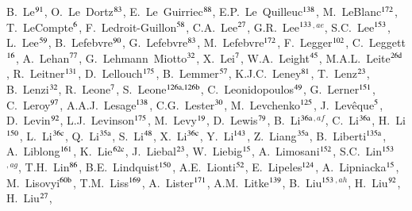 \begin{flushleft}
B.~Le$^\textrm{\scriptsize 91}$,
O.~Le~Dortz$^\textrm{\scriptsize 83}$,
E.~Le~Guirriec$^\textrm{\scriptsize 88}$,
E.P.~Le~Quilleuc$^\textrm{\scriptsize 138}$,
M.~LeBlanc$^\textrm{\scriptsize 172}$,
T.~LeCompte$^\textrm{\scriptsize 6}$,
F.~Ledroit-Guillon$^\textrm{\scriptsize 58}$,
C.A.~Lee$^\textrm{\scriptsize 27}$,
G.R.~Lee$^\textrm{\scriptsize 133}$$^{,ae}$,
S.C.~Lee$^\textrm{\scriptsize 153}$,
L.~Lee$^\textrm{\scriptsize 59}$,
B.~Lefebvre$^\textrm{\scriptsize 90}$,
G.~Lefebvre$^\textrm{\scriptsize 83}$,
M.~Lefebvre$^\textrm{\scriptsize 172}$,
F.~Legger$^\textrm{\scriptsize 102}$,
C.~Leggett$^\textrm{\scriptsize 16}$,
A.~Lehan$^\textrm{\scriptsize 77}$,
G.~Lehmann~Miotto$^\textrm{\scriptsize 32}$,
X.~Lei$^\textrm{\scriptsize 7}$,
W.A.~Leight$^\textrm{\scriptsize 45}$,
M.A.L.~Leite$^\textrm{\scriptsize 26d}$,
R.~Leitner$^\textrm{\scriptsize 131}$,
D.~Lellouch$^\textrm{\scriptsize 175}$,
B.~Lemmer$^\textrm{\scriptsize 57}$,
K.J.C.~Leney$^\textrm{\scriptsize 81}$,
T.~Lenz$^\textrm{\scriptsize 23}$,
B.~Lenzi$^\textrm{\scriptsize 32}$,
R.~Leone$^\textrm{\scriptsize 7}$,
S.~Leone$^\textrm{\scriptsize 126a,126b}$,
C.~Leonidopoulos$^\textrm{\scriptsize 49}$,
G.~Lerner$^\textrm{\scriptsize 151}$,
C.~Leroy$^\textrm{\scriptsize 97}$,
A.A.J.~Lesage$^\textrm{\scriptsize 138}$,
C.G.~Lester$^\textrm{\scriptsize 30}$,
M.~Levchenko$^\textrm{\scriptsize 125}$,
J.~Lev\^eque$^\textrm{\scriptsize 5}$,
D.~Levin$^\textrm{\scriptsize 92}$,
L.J.~Levinson$^\textrm{\scriptsize 175}$,
M.~Levy$^\textrm{\scriptsize 19}$,
D.~Lewis$^\textrm{\scriptsize 79}$,
B.~Li$^\textrm{\scriptsize 36a}$$^{,af}$,
C.~Li$^\textrm{\scriptsize 36a}$,
H.~Li$^\textrm{\scriptsize 150}$,
L.~Li$^\textrm{\scriptsize 36c}$,
Q.~Li$^\textrm{\scriptsize 35a}$,
S.~Li$^\textrm{\scriptsize 48}$,
X.~Li$^\textrm{\scriptsize 36c}$,
Y.~Li$^\textrm{\scriptsize 143}$,
Z.~Liang$^\textrm{\scriptsize 35a}$,
B.~Liberti$^\textrm{\scriptsize 135a}$,
A.~Liblong$^\textrm{\scriptsize 161}$,
K.~Lie$^\textrm{\scriptsize 62c}$,
J.~Liebal$^\textrm{\scriptsize 23}$,
W.~Liebig$^\textrm{\scriptsize 15}$,
A.~Limosani$^\textrm{\scriptsize 152}$,
S.C.~Lin$^\textrm{\scriptsize 153}$$^{,ag}$,
T.H.~Lin$^\textrm{\scriptsize 86}$,
B.E.~Lindquist$^\textrm{\scriptsize 150}$,
A.E.~Lionti$^\textrm{\scriptsize 52}$,
E.~Lipeles$^\textrm{\scriptsize 124}$,
A.~Lipniacka$^\textrm{\scriptsize 15}$,
M.~Lisovyi$^\textrm{\scriptsize 60b}$,
T.M.~Liss$^\textrm{\scriptsize 169}$,
A.~Lister$^\textrm{\scriptsize 171}$,
A.M.~Litke$^\textrm{\scriptsize 139}$,
B.~Liu$^\textrm{\scriptsize 153}$$^{,ah}$,
H.~Liu$^\textrm{\scriptsize 92}$,
H.~Liu$^\textrm{\scriptsize 27}$,

\end{flushleft}
